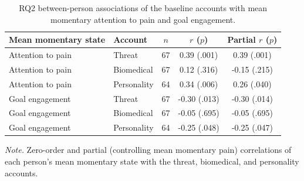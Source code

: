 \begin{table}[H]
\raggedright
\caption{RQ2 between-person associations of the baseline accounts with mean momentary attention to pain and goal engagement.}
\label{tab:link}
\footnotesize
\begingroup
\setlength{\tabcolsep}{4pt}
\renewcommand{\arraystretch}{1.08}
\noindent
\begin{tabular*}{\textwidth}{@{\extracolsep{\fill}}llccc@{}}
\toprule
Mean momentary state & Account & $n$ & $r$ ($p$) & Partial $r$ ($p$) \\
\midrule
Attention to pain & Threat & 67 & 0.39 (.001) & 0.39 (.001) \\
Attention to pain & Biomedical & 67 & 0.12 (.316) & -0.15 (.215) \\
Attention to pain & Personality & 64 & 0.34 (.006) & 0.26 (.040) \\
Goal engagement & Threat & 67 & -0.30 (.013) & -0.30 (.014) \\
Goal engagement & Biomedical & 67 & -0.05 (.695) & -0.05 (.695) \\
Goal engagement & Personality & 64 & -0.25 (.048) & -0.25 (.047) \\
\bottomrule
\end{tabular*}
\par\vspace{3pt}\noindent\parbox{\textwidth}{\footnotesize\textit{Note.} Zero-order and partial (controlling mean momentary pain) correlations of each person's mean momentary state with the threat, biomedical, and personality accounts.}
\endgroup
\end{table}

